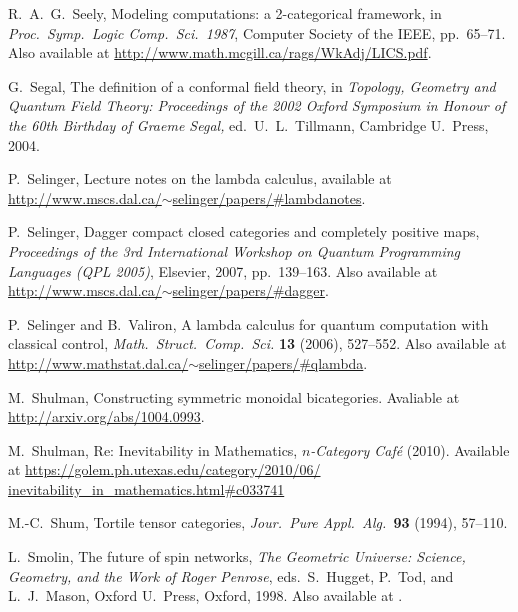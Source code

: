\documentclass[12pt,twoside,openright]{report}
\begin{document}
\begin{thebibliography}{99}
R.\ A.\ G.\ Seely, Modeling computations: a
2-categorical framework, in {\sl Proc.\ Symp.\ Logic Comp.\ 
Sci.\ 1987}, Computer Society of the IEEE, pp.\ 65--71. Also available at \hfill \break 
\href{http://www.math.mcgill.ca/rags/WkAdj/LICS.pdf}
{http://www.math.mcgill.ca/rags/WkAdj/LICS.pdf}.

 G.\ Segal, The definition of a conformal field theory, in {\sl Topology, Geometry and Quantum Field Theory: Proceedings of the 
2002 Oxford Symposium in Honour of the 60th Birthday of Graeme Segal,} 
ed.\ U.\ L.\ Tillmann, Cambridge U.\ Press, 2004.

 P.\ Selinger, Lecture notes on the lambda calculus, available at \hfill \break
\href{http://www.mscs.dal.ca/~selinger/papers/#lambdanotes}
{http://www.mscs.dal.ca/$\sim$selinger/papers/\#lambdanotes}.

 P.\ Selinger, Dagger compact closed categories and completely positive maps, {\sl Proceedings of the 3rd International Workshop on Quantum Programming Languages (QPL 2005)}, Elsevier, 2007, pp.\ 139--163. Also available at \href{http://www.mscs.dal.ca/~selinger/papers/#dagger}
{http://www.mscs.dal.ca/$\sim$selinger/papers/\#dagger}.

 P.\ Selinger and B.\ Valiron, A lambda calculus for quantum computation with classical control,
{\sl Math.\ Struct.\ Comp.\ Sci.} {\bf 13} (2006), 527--552. Also available at \hfill \break 
\href{http://www.mathstat.dal.ca/~selinger/papers/#qlambda}
{http://www.mathstat.dal.ca/$\sim$selinger/papers/\#qlambda}.

 M.\ Shulman, Constructing symmetric monoidal bicategories.  Avaliable at \href{http://arxiv.org/abs/1004.0993}{http://arxiv.org/abs/1004.0993}.

 M.\ Shulman, Re: Inevitability in Mathematics,
{\sl $n$-Category Caf\'e} (2010).  Available at
\href{https://golem.ph.utexas.edu/category/2010/06/inevitability_in_mathematics.html#c033741}
{https://golem.ph.utexas.edu/category/2010/06/}\\
\href{https://golem.ph.utexas.edu/category/2010/06/inevitability_in_mathematics.html#c033741}
{inevitability\_in\_mathematics.html\#c033741}

M.-C.\ Shum, Tortile tensor categories,
\textsl{Jour.\ Pure Appl.\ Alg.\ }\textbf{93} (1994), 57--110.

 L.\ Smolin, The future of spin networks, 
{\sl The Geometric Universe: Science, Geometry, and the Work of Roger Penrose}, eds.\ S.\ Hugget, P.\ Tod, and L.\ J.\ Mason, Oxford U.\ Press, Oxford, 1998.  Also available at .


\end{thebibliography}
\end{document}
